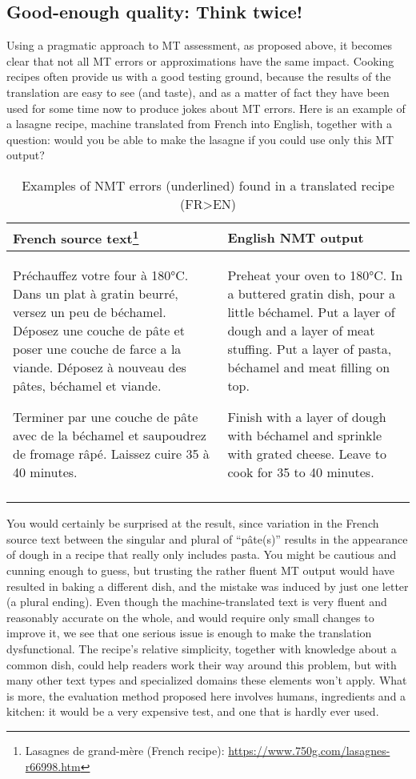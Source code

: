 \documentclass[output=paper]{langscibook}
\begin{document}
\subsection{Good-enough quality: Think twice!}

Using a pragmatic approach to MT assessment, as proposed above, it becomes clear that not all MT errors or approximations have the same impact. Cooking recipes often provide us with a good testing ground, because the results of the translation are easy to see (and taste), and as a matter of fact they have been used for some time now to produce jokes about MT errors. Here is an example of a lasagne recipe, machine translated from French into English, together with a question: would you be able to make the lasagne if you could use only this MT output? 


\begin{table}
\begin{tabularx}{\textwidth}{XX}
\lsptoprule
{French source text\footnote{Lasagnes de grand-mère (French recipe): \url{https://www.750g.com/lasagnes-r66998.htm}}} & {English NMT output}\\
\midrule
Préchauffez votre four à 180°C. Dans un plat à gratin beurré, versez un peu de béchamel. Déposez une couche de pâte et poser une couche de farce a la viande. Déposez à nouveau des pâtes, béchamel et viande.

Terminer par une couche de pâte avec de la béchamel et saupoudrez de fromage râpé. Laissez cuire 35 à 40 minutes. & Preheat your oven to 180°C. In a buttered gratin dish, pour a little béchamel. Put a layer of dough and a layer of meat stuffing. Put a layer of pasta, béchamel and meat filling on top.

Finish with a layer of dough with béchamel and sprinkle with grated cheese. Leave to cook for 35 to 40 minutes.\\
\lspbottomrule
\end{tabularx}
\caption{Examples of NMT errors (underlined) found in a translated recipe (FR>EN)}
\label{tab:rossi:1}
\end{table}

You would certainly be surprised at the result, since variation in the French source text between the singular and plural of “pâte(s)” results in the appearance of dough in a recipe that really only includes pasta. You might be cautious and cunning enough to guess, but trusting the rather fluent MT output would have resulted in baking a different dish, and the mistake was induced by just one letter (a plural ending). Even though the machine-translated text is very fluent and reasonably accurate on the whole, and would require only small changes to improve it, we see that one serious issue is enough to make the translation dysfunctional. The recipe’s relative simplicity, together with knowledge about a common dish, could help readers work their way around this problem, but with many other text types and specialized domains these elements won’t apply. What is more, the evaluation method proposed here involves humans, ingredients and a kitchen: it would be a very expensive test, and one that is hardly ever used.
\end{document}

